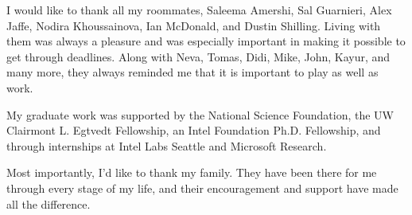 {  I would like to thank all my roommates, Saleema Amershi, Sal Guarnieri, Alex Jaffe, Nodira Khoussainova, Ian McDonald, and Dustin Shilling. Living with them was always a pleasure and was especially important in making it possible to get through deadlines. Along with Neva, Tomas, Didi, Mike, John, Kayur, and many more, they always reminded me that it is important to play as well as work.
  
  My graduate work was supported by the National Science Foundation, the UW Clairmont L. Egtvedt Fellowship, an Intel Foundation Ph.D. Fellowship, and through internships at Intel Labs Seattle and Microsoft Research.
  
  Most importantly, I'd like to thank my family. They have been there for me through every stage of my life, and their encouragement and support have made all the difference.
}